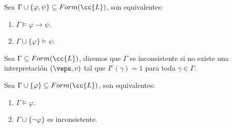 \begin{teo}[de la Deducción]
    Sea $\Gamma \cup \{\varphi,\psi\}\subseteq Form(\cc{L})$, son equivalentes:
    \begin{enumerate}
        \item $\Gamma\vDash\varphi\to\psi$.
        \item $\Gamma\cup\{\varphi\}\vDash\psi$.
    \end{enumerate}
\end{teo}

\begin{definicion}[Inconsistencia]
    Sea $\Gamma\subseteq Form(\cc{L})$, diremos que $\Gamma$ es inconsistente si no existe una interpretación $(\veps,v)$ tal que $I^v(\gamma)=1$ para toda $\gamma\in\Gamma$.
\end{definicion}

\begin{teo}
    Sea $\Gamma\cup \{\varphi\}\subseteq Form(\cc{L})$, son equivalentes:
    \begin{enumerate}
        \item $\Gamma\vDash\varphi$.
        \item $\Gamma\cup\{\neg \varphi\}$ es inconsistente.
    \end{enumerate}
\end{teo}

